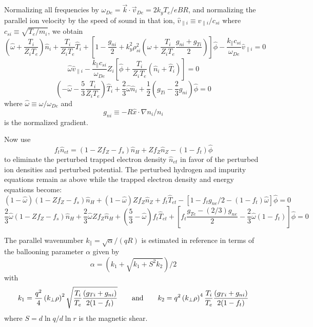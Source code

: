 Normalizing all frequencies by 
$\omega_{De} = \vec{k} \cdot \vec{v}_{De} = 2 k_y T_e /  e B R $,
and normalizing the parallel ion velocity by the speed of sound 
in that ion,
$ \hat{v}_{\parallel i} \equiv v_{\parallel i} / c_{si} $ 
where $ c_{si} \equiv \sqrt{T_e / m_i} $,
we obtain
\[ ( \hat{\omega} + \frac{T_i}{Z_i T_e} ) \hat{n}_i
  + \frac{T_i}{Z_i T_e} \hat{T}_i
  + \left[ 1 - \frac{g_{ni}}{2}
  + k_y^2 \rho_{si}^2 \left( \hat{\omega}
    + \frac{T_i}{Z_i T_e} \frac{g_{ni}+g_{Ti}}{2}
    \right) \right] \hat{\phi}
  - \frac{k_\parallel c_{si}}{\omega_{De}} \hat{v}_{\parallel i}
  = 0 \]
\[ \hat{\omega} \hat{v}_{\parallel i}
 - \frac{k_\parallel c_{si}}{\omega_{De}} Z_i \left[ \hat{\phi}
   + \frac{T_i}{Z_i T_e} ( \hat{n}_i + \hat{T}_i ) \right] = 0 \]
\[ \left( - \hat{\omega} - \frac{5}{3} \frac{T_i}{Z_i T_e}
   \right) \hat{T}_i + \frac{2}{3} \hat{\omega} \hat{n}_i
   + \frac{1}{2} \left( g_{Ti} - \frac{2}{3} g_{ni}
     \right) \hat{\phi} = 0 \]
where $ \hat{\omega} \equiv \omega / \omega_{De} $
and
\[ g_{ni} \equiv - R \hat{x} \cdot \nabla n_i / n_i \]
is the normalized gradient.

Now use
\[ f_t \hat{n}_{et} = ( 1 - Z f_Z - f_s ) \hat{n}_H
   + Z f_Z \hat{n}_Z - ( 1 - f_t ) \hat{\phi} \]
to eliminate the perturbed trapped electron density $\hat{n}_{et}$
in favor of the perturbed ion densities and perturbed potential.
The perturbed hydrogen and impurity equations remain as above
while the trapped electron density and energy equations become:
\[ (1-\hat{\omega}) ( 1 - Z f_Z - f_s ) \hat{n}_H
 + (1-\hat{\omega}) Z f_Z \hat{n}_Z  + f_t \hat{T}_{et}
 - [ 1 - f_t g_{ne} / 2 - ( 1 - f_t ) \hat{\omega} ] \hat{\phi}
 = 0 \]
\[ \frac{2}{3} \hat{\omega} ( 1 - Z f_Z - f_s ) \hat{n}_H
 + \frac{2}{3} \hat{\omega} Z f_Z \hat{n}_H
 + \left( \frac{5}{3} - \hat{\omega} \right) f_t \hat{T}_{et}
 + \left[ f_t \frac{g_{Te} - (2/3) g_{ne}}{2}
   - \frac{2}{3} \hat{\omega} ( 1 - f_t ) \right] \hat{\phi}
 = 0  \]

The parallel wavenumber $ k_\parallel = \sqrt{\alpha} / ( q R ) $
is estimated in reference \cite{weil92a}
in terms of the ballooning parameter $\alpha$ given by
\begin{equation}
\alpha = \left( k_1 + \sqrt{k_1 + S^2 k_2} \right) / 2
\end{equation}
with
\begin{equation}
k_1 = \frac{q^2}{4} \left( k_{\perp}\rho \right)^2
   \sqrt{ \frac{T_i}{T_e} \frac{ ( g_{Ti} + g_{ni} ) }{ 2 ( 1 - f_t ) } }
\qquad{\rm and}\qquad
k_2 = q^2 \left( k_{\perp}\rho \right)^4
    \frac{T_i}{T_e} \frac{ ( g_{Ti} + g_{ni} ) }{ 2 ( 1 - f_t ) } 
\end{equation}
where $ S = d \ln q / d \ln r $ is the magnetic shear.

